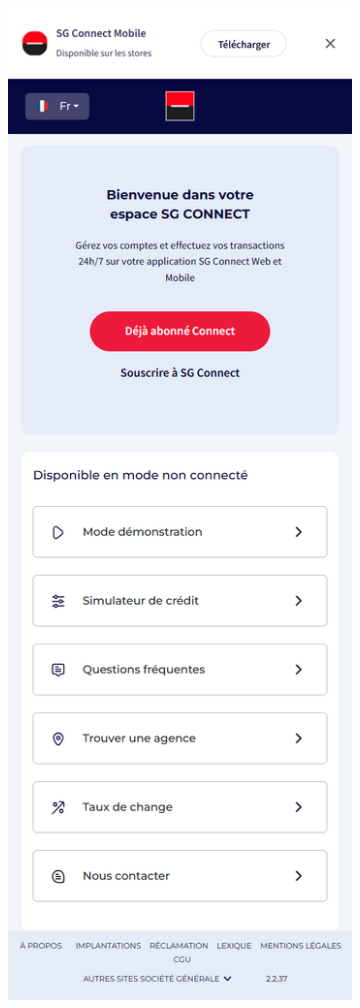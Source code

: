 \begin{figure}[!ht]
    \centering
    \begin{subfigure}[b]{0.49\textwidth}
        \centering
        \includegraphics[width=\textwidth]{images/screens/accueil/mob.png}

\end{subfigure}
\end{figure}
